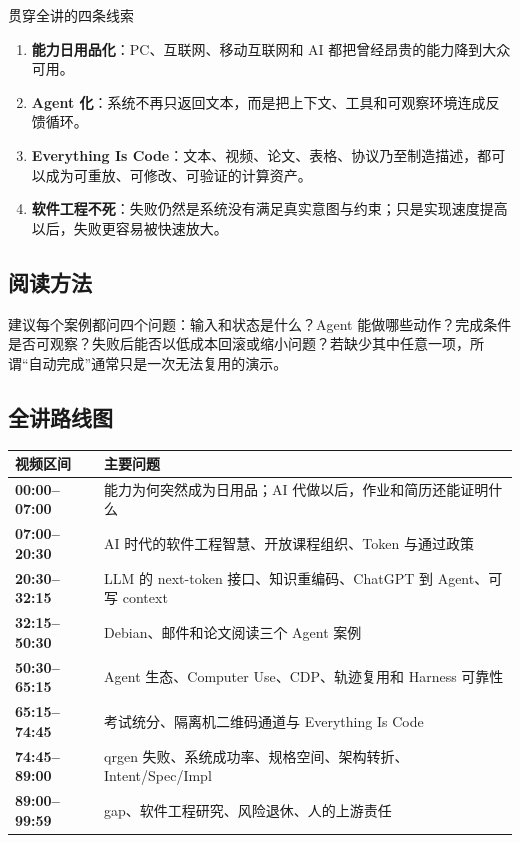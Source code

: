 \documentclass[a4paper,11pt]{article}
\begin{document}
\begin{knowledgebox}{贯穿全讲的四条线索}
\begin{enumerate}
  \item \textbf{能力日用品化}：PC、互联网、移动互联网和 AI 都把曾经昂贵的能力降到大众可用。
  \item \textbf{Agent 化}：系统不再只返回文本，而是把上下文、工具和可观察环境连成反馈循环。
  \item \textbf{Everything Is Code}：文本、视频、论文、表格、协议乃至制造描述，都可以成为可重放、可修改、可验证的计算资产。
  \item \textbf{软件工程不死}：失败仍然是系统没有满足真实意图与约束；只是实现速度提高以后，失败更容易被快速放大。
\end{enumerate}
\end{knowledgebox}

\subsection{阅读方法}

建议每个案例都问四个问题：输入和状态是什么？Agent 能做哪些动作？完成条件是否可观察？失败后能否以低成本回滚或缩小问题？若缺少其中任意一项，所谓“自动完成”通常只是一次无法复用的演示。

\subsection{全讲路线图}

\begin{center}
\small
\begin{tabularx}{\textwidth}{>{\bfseries}p{} X}
\toprule
视频区间 & 主要问题 \\
\midrule
00:00--07:00 & 能力为何突然成为日用品；AI 代做以后，作业和简历还能证明什么 \\
07:00--20:30 & AI 时代的软件工程智慧、开放课程组织、Token 与通过政策 \\
20:30--32:15 & LLM 的 next-token 接口、知识重编码、ChatGPT 到 Agent、可写 context \\
32:15--50:30 & Debian、邮件和论文阅读三个 Agent 案例 \\
50:30--65:15 & Agent 生态、Computer Use、CDP、轨迹复用和 Harness 可靠性 \\
65:15--74:45 & 考试统分、隔离机二维码通道与 Everything Is Code \\
74:45--89:00 & qrgen 失败、系统成功率、规格空间、架构转折、Intent/Spec/Impl \\
89:00--99:59 & gap、软件工程研究、风险退休、人的上游责任 \\
\bottomrule
\end{tabularx}
\end{center}
\end{document}

